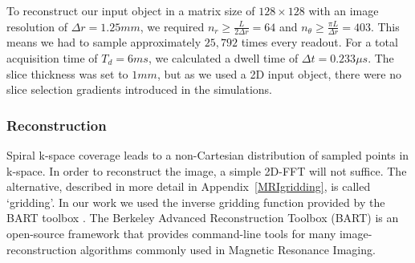\hfill

To reconstruct our input object in a matrix size of $128 \times 128$ with an image resolution of $\Delta r = 1.25mm$,
we required $n_r \geq \frac{L}{2 \Delta r} = 64$ and
$n_{\theta} \geq \frac{\pi L}{\Delta r} = 403$.
This means we had to sample approximately $25,792$ times every readout.
For a total acquisition time of $T_d = 6ms$, we calculated a dwell time of $\Delta t = 0.233 \mu s$.
The slice thickness was set to $1mm$, but as we used a 2D input object, there were no slice selection gradients introduced in the simulations.

% 
% 

\hfill

\subsubsection{Reconstruction}

Spiral k-space coverage leads to a non-Cartesian distribution of sampled points in k-space.
In order to reconstruct the image, a simple 2D-FFT will not suffice.
The alternative, described in more detail in Appendix~\ref{MRIgridding}, is called `gridding'.
In our work we used the inverse gridding function provided by the BART toolbox \cite{Lustig2016}.
The Berkeley Advanced Reconstruction Toolbox (BART) is an open-source framework that provides command-line tools for many image-reconstruction algorithms commonly used in Magnetic Resonance Imaging.

